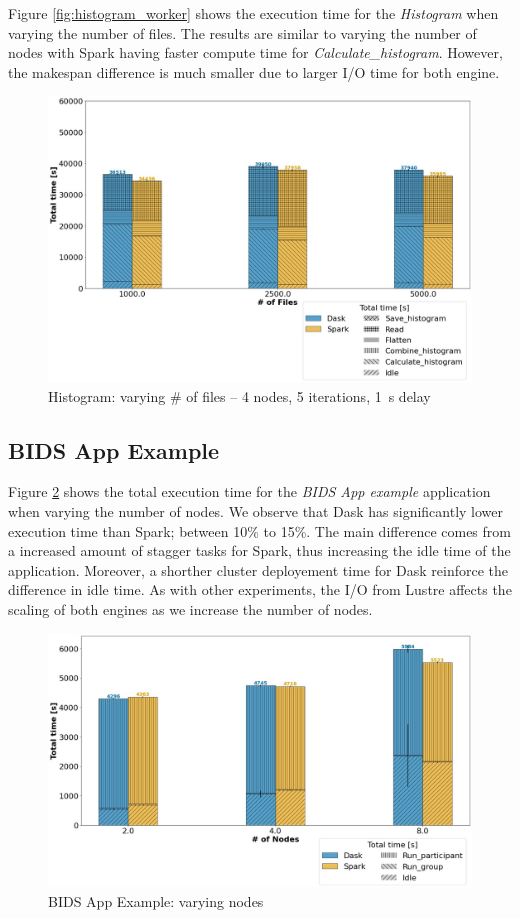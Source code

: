 \documentclass[conference]{IEEEtran}
\begin{document}
Figure \ref{fig:histogram_worker} shows the execution time for the \textit{Histogram} when varying the number of files.
The results are similar to varying the number of nodes with Spark having faster compute time for \textit{Calculate\_histogram}.
However, the makespan difference is much smaller due to larger I/O time for both engine.
\begin{figure}[!h]
	\centering
	\includegraphics[clip,width=\columnwidth]{figures/stacked_histogram_block.jpg}
	\caption{Histogram: varying \# of files -- 4 nodes, 5 iterations, \SI{1}{\second} delay}
	\label{fig:histogram_block}
\end{figure}

\subsection{BIDS App Example}
Figure \ref{fig:bids} shows the total execution time for the \textit{BIDS App example} application when varying the number of nodes.
We observe that Dask has significantly lower execution time than Spark; between 10\% to 15\%.
The main difference comes from a increased amount of stagger tasks for Spark, thus increasing the idle time of the application.
Moreover, a shorther cluster deployement time for Dask reinforce the difference in idle time.
As with other experiments, the I/O from Lustre affects the scaling of both engines as we increase the number of nodes.
\begin{figure}[!h]
	\centering
	\includegraphics[clip,width=\columnwidth]{figures/stacked_bids.jpg}
	\caption{BIDS App Example: varying nodes}
	\label{fig:bids}
\end{figure}
\end{document}
